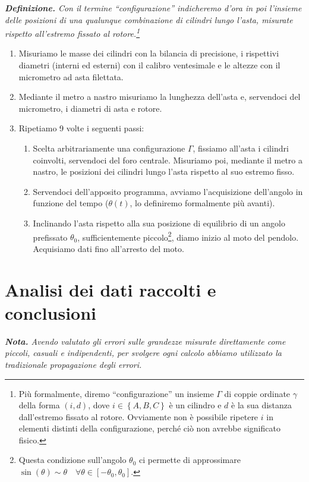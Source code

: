 \documentclass{article}
\begin{document}
\emph{
  \textbf{Definizione.} Con il termine “\emph{configurazione}”
  indicheremo d'ora in poi l'insieme delle posizioni di una
  qualunque combinazione di cilindri lungo l'asta, misurate
  rispetto all'estremo fissato al rotore.\footnote{
    Più formalmente, diremo “configurazione” un insieme $\Gamma$
    di coppie ordinate $\gamma$ della forma
    $(i,d)$, dove $i\in\left\{A,B,C\right\}$
    è un cilindro e $d$ è la sua distanza dall'estremo fissato
    al rotore. Ovviamente non è possibile ripetere $i$ in elementi
    distinti della configurazione, perché ciò non avrebbe
    significato fisico.
  }
}

\begin{enumerate}
  \item
    Misuriamo le masse dei cilindri con la bilancia di precisione,
    i rispettivi diametri (interni ed esterni) con il calibro
    ventesimale e le altezze con il micrometro ad asta filettata.
  \item
    Mediante il metro a nastro misuriamo la lunghezza dell'asta e,
    servendoci del micrometro, i diametri di asta e rotore.
  \item
    Ripetiamo 9 volte i seguenti passi:
  \begin{enumerate}
    \item
      Scelta arbitrariamente una configurazione $\Gamma$,
      fissiamo all'asta i cilindri coinvolti,
      servendoci del foro centrale.
      Misuriamo poi, mediante il metro a nastro,
      le posizioni dei cilindri lungo l'asta
      rispetto al suo estremo fisso.
    \item
      Servendoci dell'apposito programma, avviamo
      l'acquisizione dell'angolo in funzione del tempo
      ($\theta(t)$, lo definiremo formalmente più avanti).
    \item
      Inclinando l'asta rispetto alla sua posizione di equilibrio
      di un angolo prefissato $\theta_0$,
      sufficientemente piccolo\footnote{
Questa condizione sull'angolo $\theta_0$ ci permette di approssimare
$\sin(\theta) \sim \theta\quad\forall \theta \in [-\theta_0, \theta_0]$.
      }, diamo inizio al moto del pendolo.
      Acquisiamo dati fino all'arresto del moto.
  \end{enumerate}
\end{enumerate}

\section{Analisi dei dati raccolti e conclusioni}
\emph{\textbf{Nota.}
Avendo valutato gli errori sulle grandezze misurate direttamente
come piccoli, casuali e indipendenti, per svolgere ogni calcolo
abbiamo utilizzato la tradizionale propagazione degli errori.
}
\end{document}
